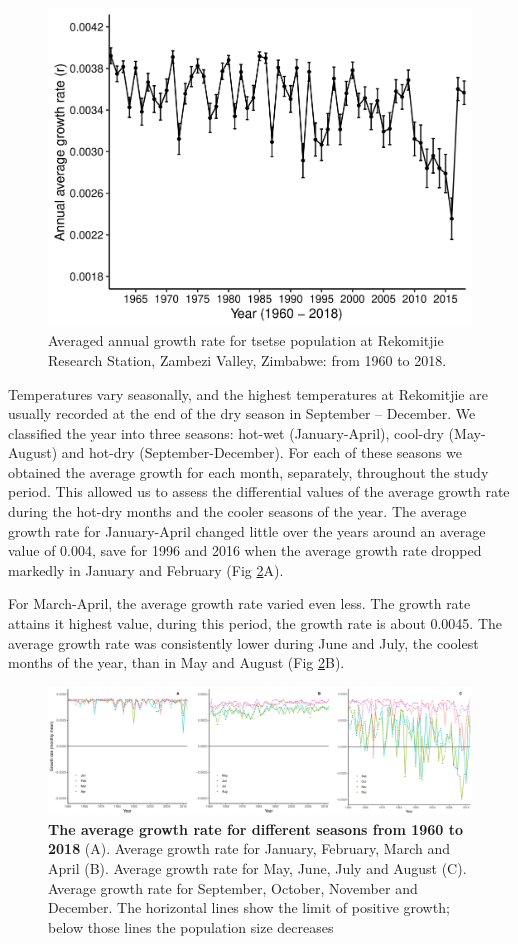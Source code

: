 \documentclass[12pt,a4paper]{article}
\begin{document}
\begin{figure}[hbt!]
	\centering
	\includegraphics[width=0.8\linewidth]{GratewithErrBars}
	\caption{Averaged annual growth rate for tsetse population at Rekomitjie Research Station, Zambezi Valley, Zimbabwe: from 1960 to 2018.}
	\label{fig:tsetseflowchat0}
\end{figure} 
Temperatures vary seasonally, and the highest temperatures at Rekomitjie are usually recorded at the end of the dry season in September – December. We classified the year into three seasons: hot-wet (January-April), cool-dry (May-August) and hot-dry (September-December). For each of these seasons we obtained the average growth for each month, separately, throughout the study period. This allowed us to assess the differential values of the average growth rate during the hot-dry months and the cooler seasons of the year. The average growth rate for January-April changed little over the years around an average value of 0.004, save for 1996 and 2016 when the average growth rate dropped markedly in January and February (Fig \ref{fig:tsetseflowchat2}A).  

For March-April, the average growth rate varied even less. The growth rate attains it highest value, during this period, the growth rate is about 0.0045. The average growth rate was consistently lower during June and July, the coolest months of the year, than in May and August (Fig \ref{fig:tsetseflowchat2}B).  

\begin{figure}[h]
	\centering
	\includegraphics[width=1.1\linewidth]{MonthlyGrowthRateDec12}
	\caption{ {\bf The average growth rate for different seasons from 1960 to 2018} (A). Average growth rate for January, February, March and April (B). Average growth rate for May, June, July and August (C). Average growth rate for September, October, November and December. The horizontal lines show the limit of positive growth; below those lines the population size decreases}
	\label{fig:tsetseflowchat2}
\end{figure}
\end{document}
